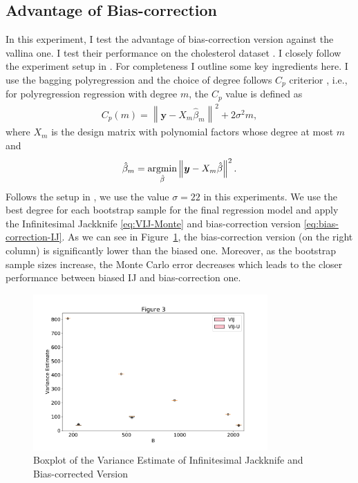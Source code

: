 \documentclass[11pt]{article}
\begin{document}
\subsection{Advantage of Bias-correction}
In this experiment, I test the advantage of bias-correction version against the vallina one.
I test their performance on the cholesterol dataset \cite{efron1991compliance}.
I closely follow the experiment setup in \cite{efron2012model}.
For completeness I outline some key ingredients here.
I use the bagging polyregression and the choice of degree follows $C_p$ criterior \cite{mallows2000some}, i.e., for polyregression regression with degree $m$, the $C_p$ value is defined as
\begin{align*}
	C_{p}(m)=\left\|\boldsymbol{y}-X_{m} \hat{\beta}_{m}\right\|^{2}+2 \sigma^{2} m,
\end{align*}
where $X_m$ is the design matrix with polynomial factors whose degree at most $m$ and 
$$
\hat{\beta}_m = \operatornamewithlimits{argmin}_{\hat{\beta}}\left\|\boldsymbol{y}-X_{m} \hat{\beta}\right\|^{2}.
$$
Follows the setup in \cite{efron2012model}, we use the value $\sigma=22$ in this experiments.
We use the best degree for each bootstrap sample for the final regression model and apply the Infinitesimal Jackknife \ref{eq:VIJ-Monte} and bias-correction version \ref{eq:bias-correction-IJ}.
As we can see in Figure~\ref{fig:figure_3}, the bias-correction version (on the right column) is significantly lower than the biased one.
Moreover, as the bootstrap sample sizes increase, the Monte Carlo error decreases which leads to the closer performance between biased IJ and bias-correction one.
\begin{figure}[htbp]
	\centering
	\includegraphics[width=0.8\textwidth]{../figures/figure_3.pdf}
	\caption{Boxplot of the Variance Estimate of Infinitesimal Jackknife and Bias-corrected Version}
	\label{fig:figure_3}
\end{figure}
\end{document}
